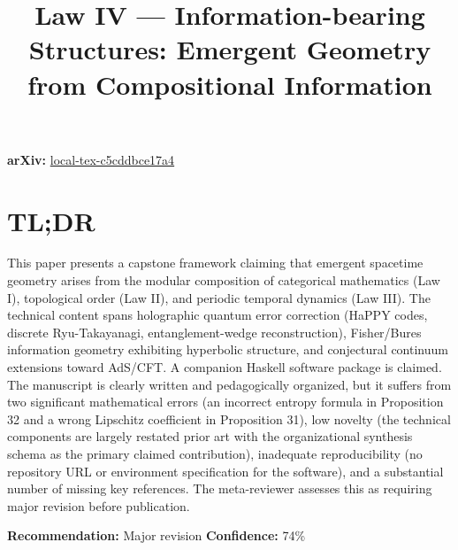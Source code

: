 \documentclass[11pt]{article}
\title{Law IV --- Information-bearing Structures: Emergent Geometry from Compositional Information}
\date{}
\begin{document}
\maketitle

\noindent\textbf{arXiv:} \href{https://arxiv.org/abs/local-tex-c5cddbce17a4}{local-tex-c5cddbce17a4}\\

\section*{TL;DR}
This paper presents a capstone framework claiming that emergent spacetime geometry arises from the modular composition of categorical mathematics (Law I), topological order (Law II), and periodic temporal dynamics (Law III). The technical content spans holographic quantum error correction (HaPPY codes, discrete Ryu-Takayanagi, entanglement-wedge reconstruction), Fisher/Bures information geometry exhibiting hyperbolic structure, and conjectural continuum extensions toward AdS/CFT. A companion Haskell software package is claimed. The manuscript is clearly written and pedagogically organized, but it suffers from two significant mathematical errors (an incorrect entropy formula in Proposition 32 and a wrong Lipschitz coefficient in Proposition 31), low novelty (the technical components are largely restated prior art with the organizational synthesis schema as the primary claimed contribution), inadequate reproducibility (no repository URL or environment specification for the software), and a substantial number of missing key references. The meta-reviewer assesses this as requiring major revision before publication.

\textbf{Recommendation:} Major revision \quad \textbf{Confidence:} 74\%\\
\end{document}
